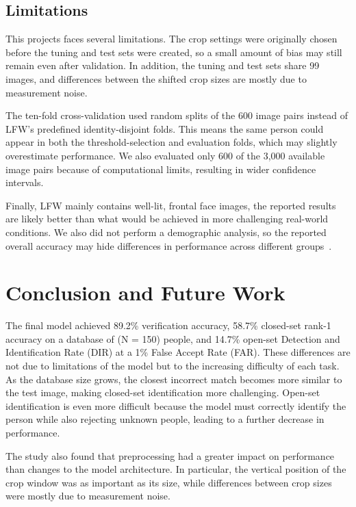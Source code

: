 \documentclass[conference]{IEEEtran}
\begin{document}
\subsection{Limitations}
\label{sec:threats}

This projects faces several limitations. The crop settings were originally chosen before the tuning and test sets were created, so a small amount of bias may still remain even after validation. In addition, the tuning and test sets share 99 images, and differences between the shifted crop sizes are mostly due to measurement noise.

The ten-fold cross-validation used random splits of the 600 image pairs instead of LFW's predefined identity-disjoint folds. This means the same person could appear in both the threshold-selection and evaluation folds, which may slightly overestimate performance. We also evaluated only 600 of the 3,000 available image pairs because of computational limits, resulting in wider confidence intervals.

Finally,  LFW mainly contains well-lit, frontal face images, the reported results are likely better than what would be achieved in more challenging real-world conditions. We also did not perform a demographic analysis, so the reported overall accuracy may hide differences in performance across different groups~\cite{buolamwini2018gendershades}.

\section{Conclusion and Future Work}

The final model achieved 89.2\% verification accuracy, 58.7\% closed-set rank-1 accuracy on a database of (N = 150) people, and 14.7\% open-set Detection and Identification Rate (DIR) at a 1\% False Accept Rate (FAR). These differences are not due to limitations of the model but to the increasing difficulty of each task. As the database size grows, the closest incorrect match becomes more similar to the test image, making closed-set identification more challenging. Open-set identification is even more difficult because the model must correctly identify the person while also rejecting unknown people, leading to a further decrease in performance.

The study also found that preprocessing had a greater impact on performance than changes to the model architecture. In particular, the vertical position of the crop window was as important as its size, while differences between crop sizes were mostly due to measurement noise.
\end{document}
